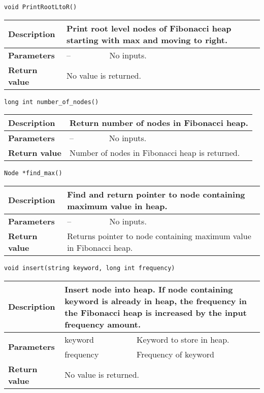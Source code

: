 \documentclass[12pt, reqno]{amsart}
\begin{document}
{\large \texttt{void PrintRootLtoR()}}
\begin{center}
    \begin{tabular}{| l | p{2.5cm} | p{9.5cm} |}
    \hline
    {\bfseries Description} & \multicolumn{2}{p{12.5cm}|}{Print root level nodes of Fibonacci heap starting with max and moving to right.} \\ \hline
    \multirow{1}{*}{\bfseries Parameters} & -- & No inputs. \\ \hline
    {\bfseries Return value} & \multicolumn{2}{p{12.5cm}|}{No value is returned.} \\ \hline
    \end{tabular}
\end{center}

{\large \texttt{long int number\_of\_nodes()}}
\begin{center}
    \begin{tabular}{| l | p{2.5cm} | p{9.5cm} |}
    \hline
    {\bfseries Description} & \multicolumn{2}{p{12.5cm}|}{Return number of nodes in Fibonacci heap.} \\ \hline
    \multirow{1}{*}{\bfseries Parameters} & -- & No inputs. \\ \hline
    {\bfseries Return value} & \multicolumn{2}{p{12.5cm}|}{Number of nodes in Fibonacci heap is returned.} \\ \hline
    \end{tabular}
\end{center}

{\large \texttt{Node *find\_max()}}
\begin{center}
    \begin{tabular}{| l | p{2.5cm} | p{9.5cm} |}
    \hline
    {\bfseries Description} & \multicolumn{2}{p{12.5cm}|}{Find and return pointer to node containing maximum value in heap.} \\ \hline
    \multirow{1}{*}{\bfseries Parameters} & -- & No inputs. \\ \hline
    {\bfseries Return value} & \multicolumn{2}{p{12.5cm}|}{Returns pointer to node containing maximum value in Fibonacci heap.} \\ \hline
    \end{tabular}
\end{center}

{\large \texttt{void insert(string keyword, long int frequency)}}
\begin{center}
    \begin{tabular}{| l | p{2.5cm} | p{9.5cm} |}
    \hline
    {\bfseries Description} & \multicolumn{2}{p{12.5cm}|}{Insert node into heap. If node containing keyword is already in heap, the frequency in the Fibonacci heap is increased by the input frequency amount.} \\ \hline
    \multirow{2}{*}{\bfseries Parameters} & keyword & Keyword to store in heap. \\ \cline{2-3}
    & frequency & Frequency of keyword \\ \hline
    {\bfseries Return value} & \multicolumn{2}{p{12.5cm}|}{No value is returned.} \\ \hline
    \end{tabular}
\end{center}
    
\end{document}

